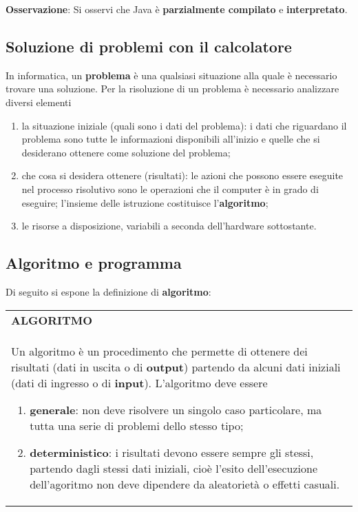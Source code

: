 \documentclass[a4paper]{extarticle}
\renewcommand\arraystretch{}
\begin{document}
\noindent
\textbf{Osservazione}: Si osservi che Java è \textbf{parzialmente compilato} e \textbf{interpretato}.

\vspace{1em}
\subsection{Soluzione di problemi con il calcolatore}
In informatica, un \textbf{problema} è una qualsiasi situazione alla quale è necessario trovare una soluzione. Per la risoluzione di un problema è necessario analizzare diversi elementi
\begin{enumerate}
  \item la situazione iniziale (quali sono i dati del problema): i dati che riguardano il problema sono tutte le informazioni disponibili all’inizio e quelle che si desiderano ottenere come soluzione del problema;
  \item che cosa si desidera ottenere (risultati): le azioni che possono essere eseguite nel processo risolutivo sono le operazioni che il computer è in grado di eseguire; l'insieme delle istruzione costituisce l'\textbf{algoritmo};
  \item le risorse a disposizione, variabili a seconda dell'hardware sottostante.
\end{enumerate}

\vspace{1em}
\noindent
\subsection{Algoritmo e programma}
Di seguito si espone la definizione di \textbf{algoritmo}:

\vspace{1em}
\setlength{\tabcolsep}{14pt}
\renewcommand{\arraystretch}{2}
\noindent
\begin{tabularx}{\textwidth}{@{}|P|@{}}
    \hline
    {\textbf{ALGORITMO}}\\
    \parbox{\linewidth}{Un algoritmo è un procedimento che permette di ottenere dei risultati (dati in uscita o di \textbf{output}) partendo da alcuni dati iniziali (dati di ingresso o di \textbf{input}).\\
    L’algoritmo deve essere
    \begin{enumerate}
      \item \textbf{generale}: non deve risolvere un singolo caso particolare, ma tutta una serie di problemi dello stesso tipo;
      \item \textbf{deterministico}: i risultati devono essere sempre gli stessi, partendo dagli stessi dati iniziali, cioè l'esito dell'esecuzione dell'agoritmo non deve dipendere da aleatorietà o effetti casuali.
    \end{enumerate}
    \vspace{-1mm}}\\
    \hline
\end{tabularx}
\end{document}
